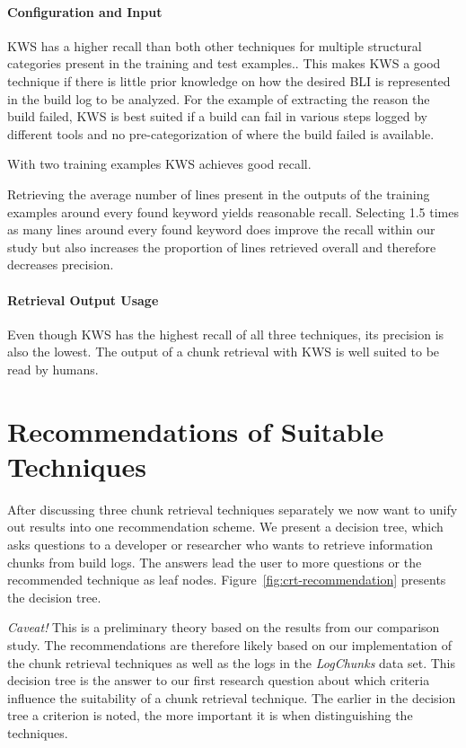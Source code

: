 \documentclass[\myrootdir/main.tex]{subfiles}
\begin{document}
\paragraph{Configuration and Input}
KWS has a higher recall than both other techniques for multiple structural categories present in the training and test examples.\@.
This makes KWS a good technique if there is little prior knowledge on how the desired BLI is represented in the build log to be analyzed.
For the example of extracting the reason the build failed, KWS is best suited if a build can fail in various steps logged by different tools and no pre-categorization of where the build failed is available.

With two training examples KWS achieves good recall.

Retrieving the average number of lines present in the outputs of the training examples around every found keyword yields reasonable recall.
Selecting 1.5 times as many lines around every found keyword does improve the recall within our study but also increases the proportion of lines retrieved overall and therefore decreases precision.

\paragraph{Retrieval Output Usage}
Even though KWS has the highest recall of all three techniques, its precision is also the lowest.
The output of a chunk retrieval with KWS is well suited to be read by humans.

\section{Recommendations of Suitable Techniques}
After discussing three chunk retrieval techniques separately we now want to unify out results into one recommendation scheme.
We present a decision tree, which asks questions to a developer or researcher who wants to retrieve information chunks from build logs.
The answers lead the user to more questions or the recommended technique as leaf nodes.
Figure~\ref{fig:crt-recommendation} presents the decision tree.

\emph{Caveat!} This is a preliminary theory based on the results from our comparison study.
The recommendations are therefore likely based on our implementation of the chunk retrieval techniques as well as the logs in the \emph{LogChunks} data set.
This decision tree is the answer to our first research question about which criteria influence the suitability of a chunk retrieval technique.
The earlier in the decision tree a criterion is noted, the more important it is when distinguishing the techniques.
\end{document}
